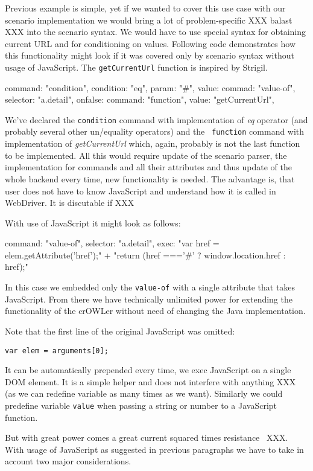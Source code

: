Previous example is simple, yet if we wanted to cover this use case with our
scenario implementation we would bring a lot of problem-specific XXX balast XXX
into the scenario syntax. We would have to use special syntax for obtaining
current URL and for conditioning on values. Following code demonstrates how this 
functionality might look if it was covered only by scenario syntax without usage
of JavaScript. The {\tt getCurrentUrl} function is inspired by Strigil. 

\begtt
{
  command: "condition", 
  condition: "eq", 
  param: "#", 
  value: {
    commad: "value-of", 
    selector: "a.detail", 
  }
  onfalse: {
    command: "function", 
    value: "getCurrentUrl", 
  }
}
\endtt

We've declared the {\tt condition} command with implementation of {\em eq}
operator (and probably several other un/equality operators) and the {\tt
function} command with implementation of {\em getCurrentUrl} which, again,
probably is not the last function to be implemented. All this would require
update of the scenario parser, the implementation for commands and all their
attributes and thus update of the whole backend every time, new functionality is
needed. The advantage is, that user does not have to know JavaScript and
understand how it is called in WebDriver. It is discutable if XXX

With use of JavaScript it might look as follows: 

\begtt
{
  command: "value-of", 
  selector: "a.detail", 
  exec: "var href = elem.getAttribute('href');" +
        "return (href ==='#' ? window.location.href : href);"
}
\endtt

In this case we embedded only the {\tt value-of} with a single attribute that
takes JavaScript. From there we have technically unlimited power for extending
the functionality of the crOWLer without need of changing the Java
implementation. 

Note that the first line of the original JavaScript was omitted: 

{\tt var elem = arguments[0];} 

It can be automatically prepended every time, we exec JavaScript on a single
DOM element. It is a simple helper and does not interfere with anything XXX (as
we can redefine variable as many times as we want). Similarly we could
predefine variable {\tt value} when passing a string or number to a JavaScript
function. 

But with great power comes a great current squared times
resistance~ XXX. With usage of JavaScript as
suggested in previous paragraphs we have to take in account two major
considerations. 

